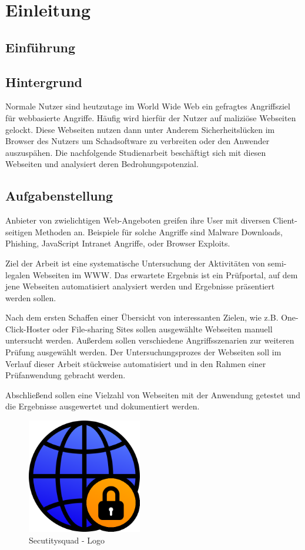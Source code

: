 \chapter{Einleitung}

\section{Einführung}


\section{Hintergrund}
Normale Nutzer sind heutzutage im World Wide Web ein gefragtes Angriffsziel für webbasierte Angriffe. Häufig wird hierfür der Nutzer auf maliziöse Webseiten gelockt. Diese Webseiten nutzen dann unter Anderem Sicherheitslücken im Browser des Nutzers um Schadsoftware zu verbreiten oder den Anwender auszuspähen. Die nachfolgende Studienarbeit beschäftigt sich mit diesen Webseiten und analysiert deren Bedrohungspotenzial.

\section{Aufgabenstellung}
Anbieter von zwielichtigen Web-Angeboten greifen ihre User mit diversen Client-seitigen Methoden an. Beispiele für solche Angriffe sind Malware Downloads, Phishing, JavaScript Intranet Angriffe, oder Browser Exploits.

Ziel der Arbeit ist eine systematische Untersuchung der Aktivitäten von semi-legalen Webseiten im \ac{WWW}. Das erwartete Ergebnis ist ein Prüfportal, auf dem jene Webseiten automatisiert analysiert werden und Ergebnisse präsentiert werden sollen.

Nach dem ersten Schaffen einer Übersicht von interessanten Zielen, wie z.B. One-Click-Hoster oder File-sharing Sites sollen ausgewählte Webseiten manuell untersucht werden. Außerdem sollen verschiedene Angriffsszenarien zur weiteren Prüfung ausgewählt werden. Der Untersuchungsprozes der Webseiten soll im Verlauf dieser Arbeit stückweise automatisiert und in den Rahmen einer Prüfanwendung gebracht werden.

Abschließend sollen eine Vielzahl von Webseiten mit der Anwendung getestet und die Ergebnisse ausgewertet und dokumentiert werden.

\begin{figure}[H]
	\centering
	\includegraphics[width=5cm]{images/securitysquad}
	\caption{Secutitysquad - Logo}
	\label{fig:securitysquad-logo}
\end{figure}

